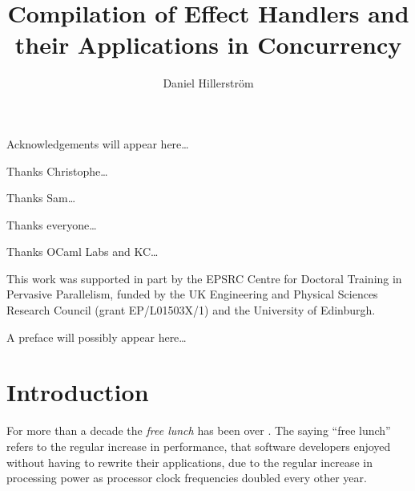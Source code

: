 \documentclass[mscres,cdtppar,twoside,openright,logo,rightchapter,normalheadings]{infthesis}
\title{Compilation of Effect Handlers and their Applications in Concurrency}
\author{Daniel Hillerström}
\theoremstyle{definition}
\begin{document}
\raggedbottom
\begin{preliminary}

\maketitle

\begin{acknowledgements}
Acknowledgements will appear here\dots

Thanks Christophe\dots

Thanks Sam\dots

Thanks everyone\dots

Thanks OCaml Labs and KC\dots

This work was supported in part by the EPSRC Centre for Doctoral Training in Pervasive Parallelism, funded by the UK Engineering and Physical Sciences Research Council (grant EP/L01503X/1) and the University of Edinburgh.
\end{acknowledgements}

\standarddeclaration


\begin{preface}
A preface will possibly appear here\dots
\end{preface}

\setcounter{secnumdepth}{2} %
\setcounter{tocdepth}{3} %
\tableofcontents

\end{preliminary}


\chapter{Introduction}
\label{ch:introduction}
For more than a decade the \emph{free lunch} has been over
\citep{Sutter2005}. The saying ``free lunch'' refers to the regular
increase in performance, that software developers enjoyed without
having to rewrite their applications, due to the regular increase in
processing power as processor clock frequencies doubled every other
year.
\end{document}
